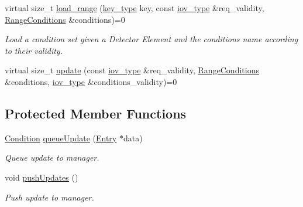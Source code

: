 \begin{DoxyCompactItemize}
virtual size\_\-t \hyperlink{class_d_d4hep_1_1_conditions_1_1_conditions_data_loader_a7c62044af7a8672ab9cb2b5bcf1022b3}{load\_\-range} (\hyperlink{class_d_d4hep_1_1_conditions_1_1_conditions_data_loader_ac17b71656c9d6b5365c62d1d606ba8cc}{key\_\-type} key, const \hyperlink{class_d_d4hep_1_1_i_o_v}{iov\_\-type} \&req\_\-validity, \hyperlink{namespace_d_d4hep_1_1_conditions_ae765f0140a33973a430280f02b6062f4}{RangeConditions} \&conditions)=0
\begin{DoxyCompactList}\small\item\em Load a condition set given a Detector Element and the conditions name according to their validity. \item\end{DoxyCompactList}\item 
virtual size\_\-t \hyperlink{class_d_d4hep_1_1_conditions_1_1_conditions_data_loader_a927c3e60a4ea2873d97433900783ffc1}{update} (const \hyperlink{class_d_d4hep_1_1_i_o_v}{iov\_\-type} \&req\_\-validity, \hyperlink{namespace_d_d4hep_1_1_conditions_ae765f0140a33973a430280f02b6062f4}{RangeConditions} \&conditions, \hyperlink{class_d_d4hep_1_1_i_o_v}{iov\_\-type} \&conditions\_\-validity)=0
\end{DoxyCompactItemize}
\subsection*{Protected Member Functions}
\begin{DoxyCompactItemize}
\item 
\hyperlink{class_d_d4hep_1_1_conditions_1_1_condition}{Condition} \hyperlink{class_d_d4hep_1_1_conditions_1_1_conditions_data_loader_a1538131327aebb04c554cecf4c512bb7}{queueUpdate} (\hyperlink{class_d_d4hep_1_1_conditions_1_1_entry}{Entry} $\ast$data)
\begin{DoxyCompactList}\small\item\em Queue update to manager. \item\end{DoxyCompactList}\item 
void \hyperlink{class_d_d4hep_1_1_conditions_1_1_conditions_data_loader_a65ad637b1fa714f1d3b784fdfcdccd37}{pushUpdates} ()
\begin{DoxyCompactList}\small\item\em Push update to manager. \item\end{DoxyCompactList}\end{DoxyCompactItemize}
